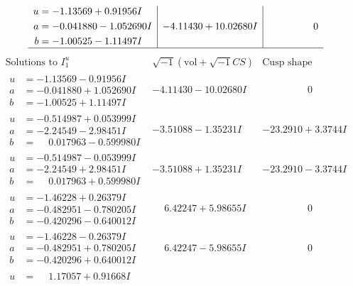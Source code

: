 \documentclass[1p]{elsarticle_modified}
\theoremstyle{definition}
\newcommand{\I}{\sqrt{-1}}
\begin{document}
$$\begin{array}{c|c|c}
\begin{aligned}
u &= -1.13569 + 0.91956 I \\
a &= -0.041880 - 1.052690 I \\
b &= -1.00525 - 1.11497 I\end{aligned}
 & -4.11430 + 10.02680 I & \phantom{-0.000000 } 0\\
 \hline 
 \end{array}$$\newpage$$\begin{array}{c|c|c}  
\text{Solutions to }I^u_{1}& \I (\text{vol} + \sqrt{-1}CS) & \text{Cusp shape}\\
 \hline 
\begin{aligned}
u &= -1.13569 - 0.91956 I \\
a &= -0.041880 + 1.052690 I \\
b &= -1.00525 + 1.11497 I\end{aligned}
 & -4.11430 - 10.02680 I & \phantom{-0.000000 } 0 \\ \hline\begin{aligned}
u &= -0.514987 + 0.053999 I \\
a &= -2.24549 - 2.98451 I \\
b &= \phantom{-}0.017963 - 0.599980 I\end{aligned}
 & -3.51088 - 1.35231 I & -23.2910 + 3.3744 I \\ \hline\begin{aligned}
u &= -0.514987 - 0.053999 I \\
a &= -2.24549 + 2.98451 I \\
b &= \phantom{-}0.017963 + 0.599980 I\end{aligned}
 & -3.51088 + 1.35231 I & -23.2910 - 3.3744 I \\ \hline\begin{aligned}
u &= -1.46228 + 0.26379 I \\
a &= -0.482951 - 0.780205 I \\
b &= -0.420296 - 0.640012 I\end{aligned}
 & \phantom{-}6.42247 + 5.98655 I & \phantom{-0.000000 } 0 \\ \hline\begin{aligned}
u &= -1.46228 - 0.26379 I \\
a &= -0.482951 + 0.780205 I \\
b &= -0.420296 + 0.640012 I\end{aligned}
 & \phantom{-}6.42247 - 5.98655 I & \phantom{-0.000000 } 0 \\ \hline\begin{aligned}
u &= \phantom{-}1.17057 + 0.91668 I \\

\end{aligned}
\end{array}$$
\end{document}
